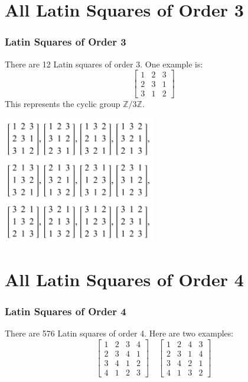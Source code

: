 \documentclass{beamer}
\begin{document}
\section{All Latin Squares of Order 3}
\begin{frame}
\frametitle{Latin Squares of Order 3}
There are 12 Latin squares of order 3. One example is:
\[ 
\begin{bmatrix} 
1 & 2 & 3 \\ 
2 & 3 & 1 \\ 
3 & 1 & 2 
\end{bmatrix}
\]
This represents the cyclic group \( \mathbb{Z}/3\mathbb{Z} \).
\end{frame}

\begin{frame}
\includegraphics[width=0.5\textwidth]{img17}
\end{frame}

\section{All Latin Squares of Order 4}
\begin{frame}
\frametitle{Latin Squares of Order 4}
There are 576 Latin squares of order 4. Here are two examples:
\[
\begin{bmatrix}
1 & 2 & 3 & 4 \\
2 & 3 & 4 & 1 \\
3 & 4 & 1 & 2 \\
4 & 1 & 2 & 3
\end{bmatrix}
\quad
\begin{bmatrix}
1 & 2 & 4 & 3 \\
2 & 3 & 1 & 4 \\
3 & 4 & 2 & 1 \\
4 & 1 & 3 & 2
\end{bmatrix}
\]
\end{frame}
\end{document}
